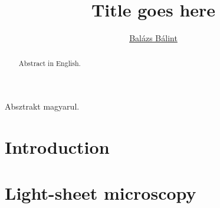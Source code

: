 \documentclass{diploma_style}
\author{\href{mailto:balint.balazs@embl.de}{Balázs Bálint}}
\title{Title goes here}
\begin{document}
\maketitle
{}





\begin{absztrakt}
Absztrakt magyarul.
\end{absztrakt}

\begin{abstract}
Abstract in English.
\end{abstract}



\tableofcontents
\setcounter{page}{1}



\chapter{Introduction}
\cite{huisken_optical_2004}


\chapter{Light-sheet microscopy}
\end{document}
